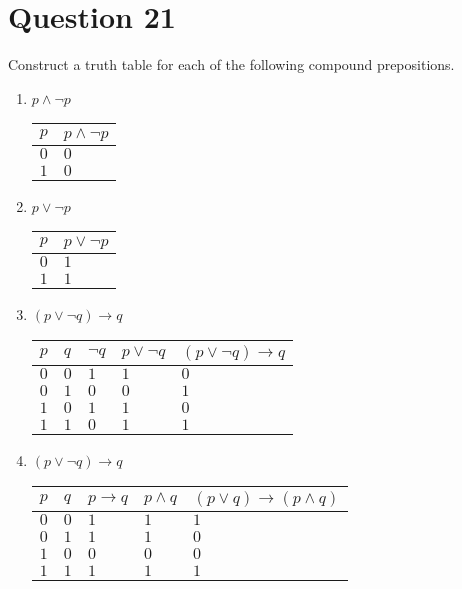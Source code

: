 \documentclass[12pt]{extarticle}
\begin{document}
\section*{Question 21}
	Construct a truth table for each of the following compound prepositions.
	\begin{enumerate}
		\item $p \wedge \neg p$\\
			\begin{tabular}{ | p{2cm} | p{2cm} |}
				\hline $p$ & $p \wedge \neg p$\\ \hline\hline
				$0$ & $0$ \\ \hline
				$1$ & $0$ \\ \hline 
			\end{tabular}


		\item $p \vee \neg p$\\
			\begin{tabular}{ | p{2cm} | p{2cm} |}
				\hline $p$ & $p \vee \neg p$\\ \hline\hline
				$0$ & $1$ \\ \hline
				$1$ & $1$ \\ \hline 
			\end{tabular}

		\item $(p \vee \neg q) \to q$\\
			\begin{tabular}{ | p{2cm} | p{2cm} | p{2cm} | p{2cm} | p{3cm} |}
				\hline $p$ & $q$ & $\neg q$ & $p \vee \neg q$ & $(p \vee \neg q) \to q$\\ \hline\hline
				$0$ & $0$ & $1$ & $1$ & $0$\\ \hline
				$0$ & $1$ & $0$ & $0$ & $1$\\ \hline
				$1$ & $0$ & $1$ & $1$ & $0$\\ \hline
				$1$ & $1$ & $0$ & $1$ & $1$\\ \hline
			\end{tabular}

		\item $(p \vee \neg q) \to q$\\
			\begin{tabular}{ | p{2cm} | p{2cm} | p{2cm} | p{2cm} | p{3cm} |}
				\hline $p$ & $q$ & $p \to q$ & $p \wedge q$ & $(p \vee q) \to (p \wedge q)$\\ \hline\hline
				$0$ & $0$ & $1$ & $1$ & $1$\\ \hline
				$0$ & $1$ & $1$ & $1$ & $0$\\ \hline
				$1$ & $0$ & $0$ & $0$ & $0$\\ \hline
				$1$ & $1$ & $1$ & $1$ & $1$\\ \hline
			\end{tabular}


\end{enumerate}
\end{document}
